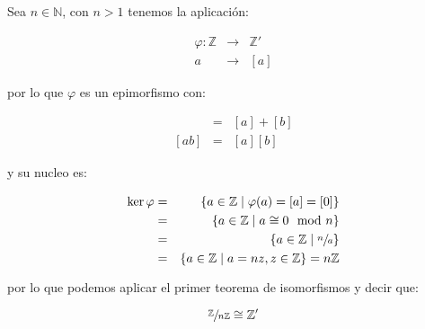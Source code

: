         \begin{ejemplo}
            Sea $n \in \mathbb{N}$, con $n > 1$ tenemos la aplicación:

            \begin{eqnarray*}
                \varphi \colon \mathbb{Z} & \to & \mathbb{Z}' \\
                 a & \to & [a]
            \end{eqnarray*}

            por lo que $\varphi$ es un epimorfismo con:

            \begin{eqnarray*}
                [a + b] & = & [a] + [b] \\[0cm]
                [ab] & = & [a] [b]
            \end{eqnarray*}

            y su nucleo es:

            \begin{eqnarray*}
                \ker{\varphi} & = & \left\{ a \in \mathbb{Z} \mid \varphi(a) = [a] = [0] \right\} \\
                & = & \left\{ a \in \mathbb{Z} \mid a \cong 0 \mod{n} \right\} \\
                & = & \left\{ a \in \mathbb{Z} \mid \sfrac{n}{a} \right\} \\
                & = & \left\{ a \in \mathbb{Z} \mid a = n z, z \in \mathbb{Z} \right\} = n \mathbb{Z}
            \end{eqnarray*}

            por lo que podemos aplicar el primer teorema de isomorfismos y decir que:

            \begin{equation*}
                \sfrac{\mathbb{Z}}{n \mathbb{Z}} \cong \mathbb{Z}'
            \end{equation*}
        \end{ejemplo}

